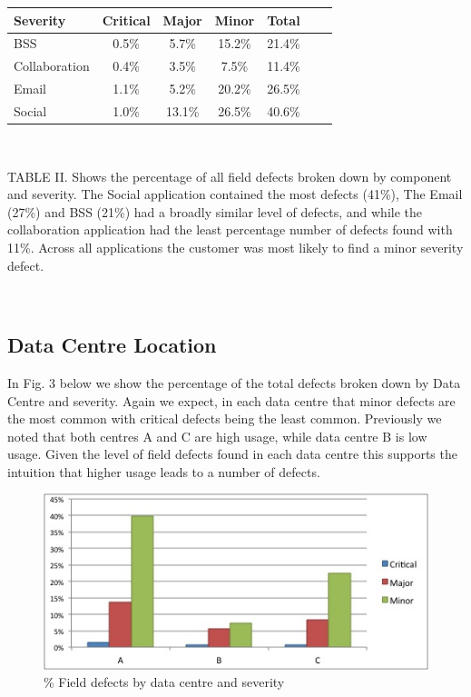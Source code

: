\documentclass[conference]{IEEEtran}
\begin{document}
\begin{tabular}{l*{5}{c}r} Severity & Critical & Major & Minor &  Total \\ \hline BSS & 0.5\%	& 5.7\% & 15.2\% & 21.4\% \\ Collaboration &	0.4\% & 3.5\% & 7.5\% & 11.4\% \\ Email	& 1.1\% & 5.2\% & 20.2\%	 & 26.5\%  \\  Social	& 1.0\% & 13.1\% & 26.5\% & 40.6\% \end{tabular}

\ \* 

TABLE II. Shows the percentage of all field defects broken down by component and severity. The Social application contained the most defects (41\%), The Email (27\%) and BSS (21\%) had a broadly similar level of defects, and while the collaboration application had the least percentage number of defects found with 11\%. Across all applications the customer was most likely to find a minor severity defect.

\ \*

\subsection{Data Centre Location}

In Fig. 3 below we show the percentage of the total defects broken down by Data Centre and severity. Again we expect, in each data centre that minor defects are the most common with critical defects being the least common. Previously we noted that both centres A and C are high usage, while data centre B is low usage. Given the level of field defects found in each data centre this supports the intuition that higher usage leads to a number of defects.

\begin{figure}[h]
\caption{\% Field defects by data centre and severity}
\begin{center}
\includegraphics[width=\columnwidth]{graphs/graph3.jpg} 
\end{center}
\label{fig:defectdatacentre}
\end{figure}
\end{document}
